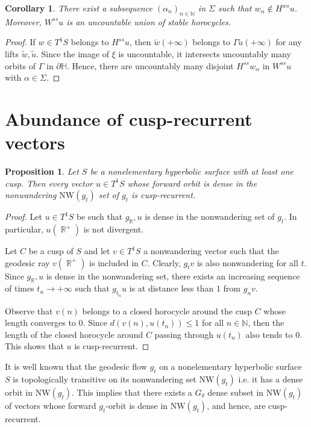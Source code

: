 \documentclass[a4paper,english,reqno]{amsart}
\DeclareMathOperator{\reals}{\mathbb{R}}
\renewcommand{\H}{\mathbb{H}}
\newcommand{\N}{\mathbb{N}} %
\newtheorem{proposition}{Proposition}
\newtheorem{corollary}{Corollary}
\theoremstyle{definition}
\numberwithin{equation}{section}
\begin{document}
\begin{corollary}\label{cor2}
	There exist a subsequence $(\alpha_n)_{n\in \N}$ in $\Sigma$ such that $w_\alpha \notin H^{ws} u$. Moreover, $W^{ss}u$ is an uncountable union of stable horocycles.
\end{corollary}
\begin{proof}
	If $w\in T^1S$ belongs to $H^{ss}u$, then $\tilde w (+\infty)$ belongs to $\Gamma \tilde u(+\infty)$ for any lifts $\tilde w, \tilde u$. Since the image of $\xi$ is uncountable, it intersects uncountably many orbits of $\Gamma$ in $\partial \H$. Hence, there are uncountably many disjoint $H^{ss} w_\alpha$ in $W^{ss} u$ with $\alpha\in \Sigma$.
\end{proof}

\section{Abundance of cusp-recurrent vectors}


\begin{proposition}\label{denseimpliescr}
	Let $S$ be a nonelementary hyperbolic surface with at least one cusp. Then every vector $u\in T^1 S$ whose forward orbit is dense in the nonwandering $\mathrm{NW} (g_t)$ set of $g_t$ is cusp-recurrent. 
\end{proposition}

\begin{proof}
	Let $u\in T^1 S$ be such that $g_{\reals^+} u$ is dense in the nonwandering set of $g_t$. In particular, $u(\reals^+)$ is not divergent.
	
	Let $C$ be a cusp of $S$ and let $v\in T^1 S$ a nonwandering vector such that the geodesic ray $v(\reals^+)$ is included in $C$. Clearly, $g_t v$ is also nonwandering for all $t$.  Since $g_{\reals^+} u$ is dense in the nonwandering set, there exists an increasing sequence of times $t_n\to +\infty$ such that $g_{t_n} u$ is at distance less than $1$ from $g_n v $. 
	
	Observe that $v(n)$ belongs to a closed horocycle around the cusp $C$ whose length converges to $0$.  Since $d(v(n), u(t_n))\le1$ for all $n\in \N$, then the length of the closed horocycle around $C$ passing through $u(t_n)$ also tends to $0$. This shows that $u$ is cusp-recurrent.
	
\end{proof}

It is well known that the geodesic flow $g_t$ on a nonelementary hyperbolic surface $S$ is topologically transitive on its nonwandering set $\mathrm{NW} (g_t)$ i.e. it has a dense orbit in $\mathrm{NW} (g_t)$. This implies that there exists a $G_\delta$ dense subset in $\mathrm{NW} (g_t)$ of vectors whose forward $g_t$-orbit is dense in $\mathrm{NW} (g_t)$, and hence, are cusp-recurrent. 
\end{document}
